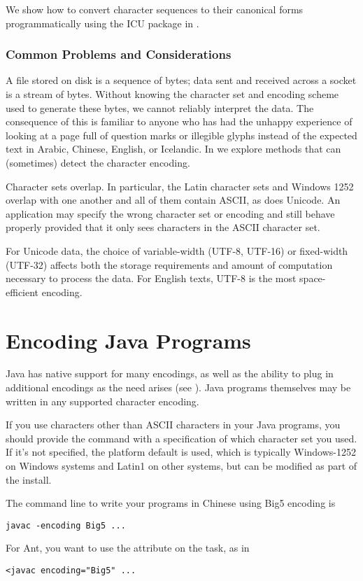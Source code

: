 We show how to convert character sequences to their canonical forms
programmatically using the ICU package in .

\subsubsection{Common Problems and Considerations}\label{section:char-probs}

A file stored on disk is a sequence of bytes; data sent and received
across a socket is a stream of bytes.  Without knowing the character set
and encoding scheme used to generate these bytes, we cannot reliably
interpret the data.
The consequence of this is familiar to anyone
who has had the unhappy experience of looking at
a page full of question marks or illegible glyphs
instead of the expected text in Arabic, Chinese,
English, or Icelandic.
In  we explore methods
that can (sometimes) detect the character encoding.

Character sets overlap.
In particular, the Latin character sets
and Windows 1252 overlap with one another and all of them
contain ASCII, as does Unicode.
An application may specify the wrong character set or encoding
and still behave properly provided that it only sees characters
in the ASCII character set.

For Unicode data, the choice of variable-width (UTF-8, UTF-16)
or fixed-width (UTF-32) affects both the storage requirements
and amount of computation necessary to process the data.
For English texts, UTF-8 is the most space-efficient encoding.

\section{Encoding Java Programs}

Java has native support for many encodings, as well as the ability to
plug in additional encodings as the need arises (see
).  Java programs themselves may be
written in any supported character encoding.

If you use characters other than ASCII characters in your Java
programs, you should provide the  command with a
specification of which character set you used.  If it's not specified,
the platform default is used, which is typically Windows-1252 on
Windows systems and Latin1 on other systems, but can be modified as
part of the install.  

The command line to write your programs in Chinese using Big5 encoding
is
%
\begin{verbatim}
javac -encoding Big5 ...
\end{verbatim}
%
For Ant, you want to use the  attribute on the
 task, as in
%
\begin{verbatim}
<javac encoding="Big5" ...
\end{verbatim}


